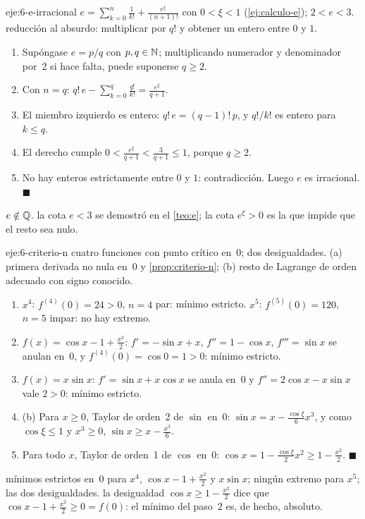 \begin{solucion}{eje:6-e-irracional}
\datos $e=\sum_{k=0}^{n}\frac1{k!}+\frac{e^{\xi}}{(n+1)!}$ con $0<\xi<1$ (\cref{ej:calculo-e}); $2<e<3$.
\planteamiento reducción al absurdo: multiplicar por $q!$ y obtener un entero entre $0$ y $1$.
\pasos
\begin{enumerate}[label=\arabic*.]
  \item Supóngase $e=p/q$ con $p,q\in\mathbb{N}$; multiplicando numerador y denominador por~2 si hace falta, puede suponerse $q\ge2$.
  \item Con $n=q$: $q!\,e-\sum_{k=0}^{q}\frac{q!}{k!}=\frac{e^{\xi}}{q+1}$.
  \item El miembro izquierdo es entero: $q!\,e=(q-1)!\,p$, y $q!/k!$ es entero para $k\le q$.
  \item El derecho cumple $0<\frac{e^{\xi}}{q+1}<\frac{3}{q+1}\le1$, porque $q\ge2$.
  \item No hay enteros estrictamente entre $0$ y $1$: contradicción. Luego $e$ es irracional. \hfill$\blacksquare$
\end{enumerate}
\resultado $e\notin\mathbb{Q}$.
\comprobacion la cota $e<3$ se demostró en el \cref{teo:e}; la cota $e^{\xi}>0$ es la que impide que el resto sea nulo.
\end{solucion}

\begin{solucion}{eje:6-criterio-n}
\datos cuatro funciones con punto crítico en~0; dos desigualdades.
\planteamiento (a) primera derivada no nula en~0 y \cref{prop:criterio-n}; (b) resto de Lagrange de orden adecuado con signo conocido.
\pasos
\begin{enumerate}[label=\arabic*.]
  \item $x^{4}$: $f^{(4)}(0)=24>0$, $n=4$ par: mínimo estricto. $x^{5}$: $f^{(5)}(0)=120$, $n=5$ impar: no hay extremo.
  \item $f(x)=\cos x-1+\frac{x^{2}}{2}$: $f'=-\sin x+x$, $f''=1-\cos x$, $f'''=\sin x$ se anulan en~0, y $f^{(4)}(0)=\cos0=1>0$: mínimo estricto.
  \item $f(x)=x\sin x$: $f'=\sin x+x\cos x$ se anula en~0 y $f''=2\cos x-x\sin x$ vale $2>0$: mínimo estricto.
  \item (b) Para $x\ge0$, Taylor de orden~2 de $\sin$ en~0: $\sin x=x-\frac{\cos\xi}{6}x^{3}$, y como $\cos\xi\le1$ y $x^{3}\ge0$, $\sin x\ge x-\frac{x^{3}}{6}$.
  \item Para todo $x$, Taylor de orden~1 de $\cos$ en~0: $\cos x=1-\frac{\cos\xi}{2}x^{2}\ge1-\frac{x^{2}}{2}$. \hfill$\blacksquare$
\end{enumerate}
\resultado mínimos estrictos en~0 para $x^{4}$, $\cos x-1+\frac{x^{2}}{2}$ y $x\sin x$; ningún extremo para $x^{5}$; las dos desigualdades.
\comprobacion la desigualdad $\cos x\ge1-\frac{x^{2}}{2}$ dice que $\cos x-1+\frac{x^{2}}{2}\ge0=f(0)$: el mínimo del paso~2 es, de hecho, absoluto.
\end{solucion}

